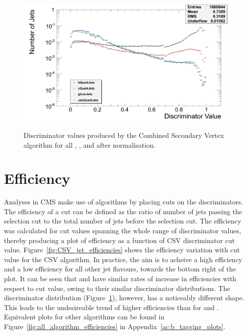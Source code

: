 \begin{figure}[hbtp]
   \centering
     \includegraphics[width=\textwidth]{Chapters/04_Analysis/04a_BTags/Images/CombinedSecondaryVertex_norm_discriminator_combined}\\
     \caption[Discriminator values produced by the Combined Secondary Vertex algorithm after
     normalisation.]{Discriminator values produced by the Combined Secondary Vertex algorithm for all \bjets,
     \cjets, \gjets and \udsjets after normalisation.}
     \label{fig:CSV_discriminators}
\end{figure}

\section{Efficiency}
\label{s:efficiency}

Analyses in CMS make use of \btagging algorithms by placing cuts on the discriminators. The efficiency of a
cut can be defined as the ratio of number of jets passing the selection cut to the total number of jets before
the selection cut. The efficiency was calculated for cut values spanning the whole range of discriminator
values, thereby producing a plot of \btag efficiency as a function of CSV discriminator cut value.
Figure~\ref{fig:CSV_jet_efficiencies} shows the \btag efficiency variation with cut value for the CSV
algorithm. In practice, the aim is to acheive a high \bjet efficiency and a low efficiency for all other jet
flavours, \ie towards the bottom right of the plot. It can be seen that \udsjets and \gjets have similar rates
of increase in efficiencies with respect to cut value, owing to their similar discriminator distributions. The
\cjet discriminator distribution (Figure~\ref{fig:CSV_discriminators}), however, has a noticeably different
shape. This leads to the undesireable trend of higher \cjet efficiencies than for \udsjets and \gjets.
Equivalent plots for other algorithms can be found in Figure~\ref{fig:all_algorithm_efficiencies} in
Appendix~\ref{ac:b_tagging_plots}.

